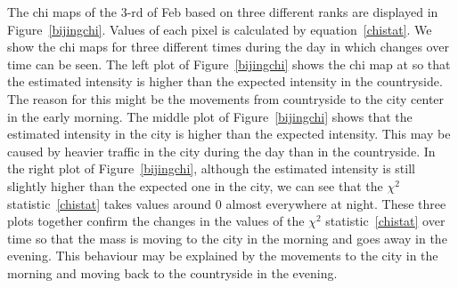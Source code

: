 \documentclass[article]{jss}
\begin{document}
  The chi maps of the $3$-rd of Feb based on three different ranks are displayed in Figure~\ref{bijingchi}. Values of each pixel is calculated by equation~\ref{chistat}.  We show the chi maps for three different times during the day in which changes over time can be seen. The left plot of Figure~\ref{bijingchi} shows the chi map at  so that the estimated intensity is higher than the expected intensity in the countryside. The reason for this might be the movements from countryside to the city center in the early morning. The middle plot of Figure~\ref{bijingchi} shows that the estimated intensity in the city is higher than the expected intensity. This may be caused  by heavier traffic in the city during the day than in the countryside. In the right plot of Figure~\ref{bijingchi}, although the estimated intensity is still slightly higher than the expected one in the city, we can see that the $\chi^2$ statistic~\ref{chistat} takes values around $0$ almost everywhere at night. These three plots together confirm the changes in the values of the $\chi^2$ statistic~\ref{chistat} over time so that the mass is moving to the city in the morning and goes away in the evening. This behaviour may be explained by the movements to the city in the morning and moving back to the countryside in the evening.
\end{document}
